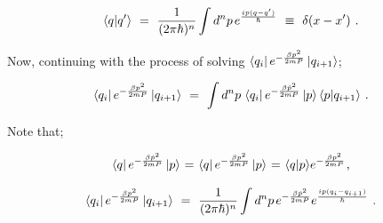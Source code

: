 \documentclass{ece}
\begin{document}
\begin{equation} \label{eq:20}
\langle q | q' \rangle \hspace{0.125cm} = \hspace{0.125cm} \frac{1}{(2 \pi \hbar)^{n}} \int d^n p \hspace{0.05cm} e^{\frac{i p (q - q')}{\hbar}} \hspace{0.125cm} \equiv \hspace{0.125cm} \delta ( x - x' ) \hspace{0.125cm} .
\end{equation}

Now, continuing with the process of solving \begin{math} \bra{q_i} e^{ - \frac{ \beta p^2}{2 m P}} \ket{q_{i+1}} \end{math}; 

\begin{equation} \label{eq:21}
\bra{q_i} e^{ - \frac{ \beta p^2}{2 m P}} \ket{q_{i+1}} \hspace{0.125cm} = \hspace{0.125cm} \int d^n p \hspace{0.05cm} \bra{q_i} e^{ - \frac{ \beta \hat{p}^2}{2 m P}} \ket{p} \langle p | q_{i+1} \rangle \hspace{0.125cm} .
\end{equation}

Note that;

\begin{equation} \label{eq:22}
\bra{q} e^{ - \frac{ \beta \hat{p}^2}{2 m P}} \ket{p} \hspace{0.025cm} = \hspace{0.025cm} \bra{q} e^{ - \frac{ \beta p^2}{2 m P}} \ket{p} \hspace{0.025cm} = \hspace{0.025cm} \langle q | p \rangle e^{ - \frac{ \beta p^2}{2 m P}} \hspace{0.025cm} ,
\end{equation}

\begin{equation} \label{eq:23}
\bra{q_i} e^{ - \frac{ \beta p^2}{2 m P}} \ket{q_{i+1}} \hspace{0.125cm} = \hspace{0.125cm} \frac{1}{(2 \pi \hbar)^{n}} \int d^n p \hspace{0.05cm} e^{{ - \frac{ \beta \hat{p}^2}{2 m P}}}  e^{{\frac{i p (q_i - q_{i+1})}{\hbar}}} \hspace{0.125cm} .
\end{equation}
\end{document}
